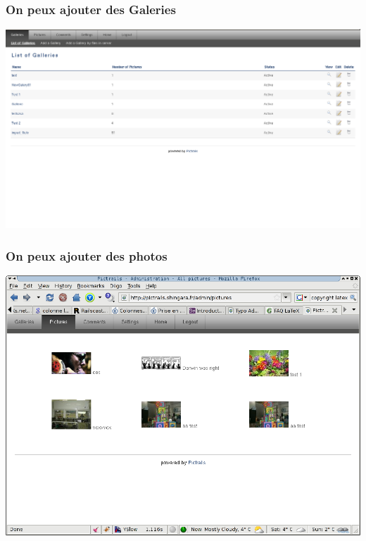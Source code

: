 \documentclass{beamer}
\begin{document}
\begin{frame}
    \frametitle{On peux ajouter des Galeries}
    \begin{center}
    \includegraphics[scale=.4]{admin_view.png}
    \end{center}
\end{frame}

\begin{frame}
    \frametitle{On peux ajouter des photos}
    \begin{center}
    \includegraphics[scale=.4]{add_picture.png}
    \end{center}
\end{frame}
\end{document}
